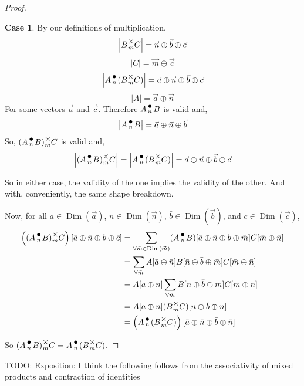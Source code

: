 \documentclass[12pt]{book}
\theoremstyle{plain}
\theoremstyle{definition}
\theoremstyle{ppart}
\theoremstyle{case}
\newtheorem{case}{Case}
\theoremstyle{solution}
\DeclareMathOperator{\Dim}{Dim}
\newcommand{\mmult}[1]{\text{\raisebox{1ex}{$\underset{#1}{\times}$}}}
\newcommand{\dmult}[1]{\text{\raisebox{1ex}{$\underset{#1}{\,\bullet\,}$}}}
\newcommand{\shape}[1]{\left|#1\right|}
\begin{document}
\begin{proof}
\begin{case}
By our definitions of multiplication,
\[ \shape{B \mmult{m} C} = \vec{n} \oplus \vec{b} \oplus \vec{c} \]
\[ \shape{C} = \vec{m} \oplus \vec{c} \]
\[ \shape{A \dmult{n} (B \mmult{m} C)} = \vec{a} \oplus \vec{n} \oplus \vec{b} \oplus \vec{c} \]
\[ \shape{A} = \vec{a} \oplus \vec{n} \]
For some vectors $\vec{a}$ and $\vec{c}$. 
Therefore $A \dmult{n} B$ is valid and,
\[ \shape{A \dmult{n} B} = \vec{a} \oplus \vec{n} \oplus \vec{b} \]
So, $(A \dmult{n} B) \mmult{m} C$ is valid and,
\[ \shape{(A \dmult{n} B) \mmult{m} C} = \shape{A \dmult{n} (B \mmult{m} C)} = \vec{a} \oplus \vec{n} \oplus \vec{b} \oplus \vec{c} \]
\end{case}

So in either case, the validity of the one implies the validity of the other. And with, conveniently, the same shape breakdown.

Now, for all $\bar{a} \in \Dim(\vec{a})$, $\bar{n} \in \Dim(\vec{n})$, $\bar{b} \in \Dim(\vec{b})$, and $\bar{c} \in \Dim(\vec{c})$,
\begin{align*}
  \left((A \dmult{n} B) \mmult{m} C\right)[\bar{a} \oplus \bar{n} \oplus \bar{b} \oplus \bar{c}]
  &=
  \sum_{\forall \bar{m} \in \Dim(\vec{m})} (A \dmult{n} B)[\bar{a} \oplus \bar{n} \oplus \bar{b} \oplus \bar{m}] C[\bar{m} \oplus \bar{n}] \\
  &=
  \sum_{\forall \bar{m}} A[\bar{a} \oplus \bar{n}] B[\bar{n} \oplus \bar{b} \oplus \bar{m}] C[\bar{m} \oplus \bar{n}] \\
  &=
  A[\bar{a} \oplus \bar{n}] \sum_{\forall \bar{m}} B[\bar{n} \oplus \bar{b} \oplus \bar{m}] C[\bar{m} \oplus \bar{n}] \\
  &=
  A[\bar{a} \oplus \bar{n}] (B \mmult{m} C)[\bar{n} \oplus \bar{b} \oplus \bar{n}] \\
  &= \left( A \dmult{n} (B \mmult{m} C) \right)[\bar{a} \oplus \bar{n} \oplus \bar{b} \oplus \bar{n}]
\end{align*}

So $(A \dmult{n} B) \mmult{m} C = A \dmult{n} (B \mmult{m} C)$.
\end{proof}

TODO: Exposition: I think the following follows from the associativity of mixed products and contraction of identities
\end{document}
